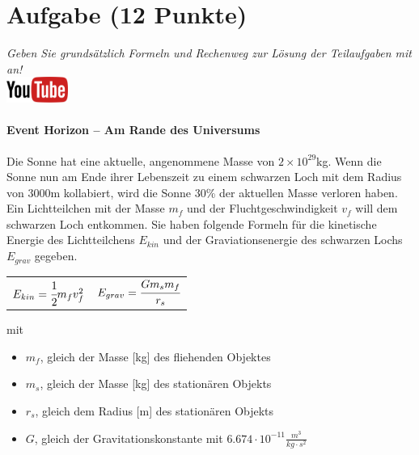 \documentclass[a4paper, 10pt]{scrartcl}\usepackage[]{graphicx}\usepackage[]{xcolor}
\begin{document}
\clearpage\null 
\clearpage

\section{Aufgabe \hfill (12 Punkte)}

\textit{Geben Sie grunds{\"a}tzlich Formeln und Rechenweg zur L{\"o}sung der
  Teilaufgaben mit an!} \\[1Ex]

\hfill\href{https://youtu.be/q-qYK4Chslg}{\includegraphics[width =
  2cm]{img/youtube}} %
\hspace{2Ex}

\paragraph{Event Horizon -- Am Rande des Universums}



Die Sonne hat eine aktuelle, angenommene Masse von $\ensuremath{2\times 10^{29}}$kg. Wenn
die Sonne nun am Ende ihrer Lebenszeit zu einem schwarzen Loch mit dem
Radius von $3000$m kollabiert, wird die Sonne $30$\%
der aktuellen Masse verloren haben. Ein Lichtteilchen mit der Masse $m_f$
und der Fluchtgeschwindigkeit $v_f$ will dem schwarzen Loch entkommen.  Sie
haben folgende Formeln f{\"u}r die kinetische Energie des Lichtteilchens
$E_{kin}$ und der Graviationsenergie des schwarzen Lochs $E_{grav}$
gegeben.

\begin{center}
  \begin{tabular}{cc}
    $E_{kin} = \cfrac{1}{2}m_fv_f^2$ & $E_{grav} = \cfrac{Gm_sm_f}{r_s}$\\
  \end{tabular}
\end{center}

mit

\begin{itemize}
\item $m_f$, gleich der Masse [kg] des fliehenden Objektes
\item $m_s$, gleich der Masse [kg] des station{\"a}ren Objekts
\item $r_s$, gleich dem Radius [m] des station{\"a}ren Objekts  
\item $G$, gleich der Gravitationskonstante mit $6.674 \cdot 10^{-11}
  \tfrac{m^3}{kg \cdot s^2}$ 
\end{itemize}
\end{document}
